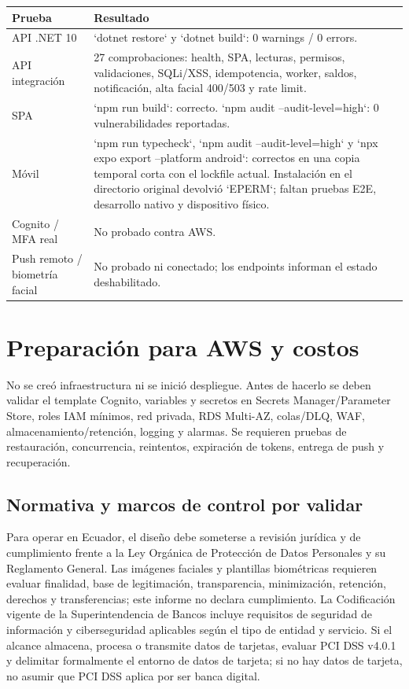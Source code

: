 \documentclass[11pt,a4paper]{report}
\begin{document}
\begin{tabularx}{\textwidth}{@{}>{\raggedright\arraybackslash}p{4.2cm}X@{}}
\toprule
\textbf{Prueba} & \textbf{Resultado} \\
\midrule
API .NET 10 & `dotnet restore` y `dotnet build`: 0 warnings / 0 errors. \\
API integración & 27 comprobaciones: health, SPA, lecturas, permisos, validaciones, SQLi/XSS, idempotencia, worker, saldos, notificación, alta facial 400/503 y rate limit. \\
SPA & `npm run build`: correcto. `npm audit --audit-level=high`: 0 vulnerabilidades reportadas. \\
Móvil & `npm run typecheck`, `npm audit --audit-level=high` y `npx expo export --platform android`: correctos en una copia temporal corta con el lockfile actual. Instalación en el directorio original devolvió `EPERM`; faltan pruebas E2E, desarrollo nativo y dispositivo físico. \\
Cognito / MFA real & No probado contra AWS. \\
Push remoto / biometría facial & No probado ni conectado; los endpoints informan el estado deshabilitado. \\
\bottomrule
\end{tabularx}

\chapter{Preparación para AWS y costos}
No se creó infraestructura ni se inició despliegue. Antes de hacerlo se deben validar el template Cognito, variables y secretos en Secrets Manager/Parameter Store, roles IAM mínimos, red privada, RDS Multi-AZ, colas/DLQ, WAF, almacenamiento/retención, logging y alarmas. Se requieren pruebas de restauración, concurrencia, reintentos, expiración de tokens, entrega de push y recuperación.

\section{Normativa y marcos de control por validar}
Para operar en Ecuador, el dise\~no debe someterse a revisi\'on jur\'idica y de cumplimiento frente a la Ley Org\'anica de Protecci\'on de Datos Personales y su Reglamento General. Las im\'agenes faciales y plantillas biom\'etricas requieren evaluar finalidad, base de legitimaci\'on, transparencia, minimizaci\'on, retenci\'on, derechos y transferencias; este informe no declara cumplimiento. La Codificaci\'on vigente de la Superintendencia de Bancos incluye requisitos de seguridad de informaci\'on y ciberseguridad aplicables seg\'un el tipo de entidad y servicio. Si el alcance almacena, procesa o transmite datos de tarjetas, evaluar PCI DSS v4.0.1 y delimitar formalmente el entorno de datos de tarjeta; si no hay datos de tarjeta, no asumir que PCI DSS aplica por ser banca digital.
\end{document}

